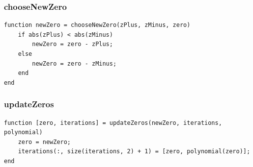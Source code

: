 \subsubsection{chooseNewZero}
\begin{simplechar}
\begin{lstlisting}
function newZero = chooseNewZero(zPlus, zMinus, zero)
    if abs(zPlus) < abs(zMinus)
        newZero = zero - zPlus;
    else
        newZero = zero - zMinus;
    end
end
\end{lstlisting}
\end{simplechar}

\newpage
\subsubsection{updateZeros}
\begin{simplechar}
\begin{lstlisting}
function [zero, iterations] = updateZeros(newZero, iterations, polynomial)
    zero = newZero;
    iterations(:, size(iterations, 2) + 1) = [zero, polynomial(zero)];
end
\end{lstlisting}
\end{simplechar}

	
	
	

